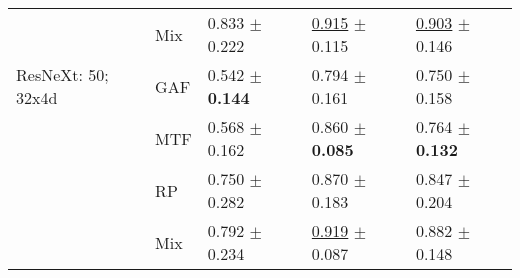 \begin{tabular}{lllll}
 & Mix & \textcolor[rgb]{0.1052631579,0.5000000000,0}{0.833} $\pm$ \textcolor[rgb]{0.5633152435,0.4366847565,0}{0.222} & \underline{\textcolor[rgb]{0.0766423358,0.5000000000,0}{0.915}} $\pm$ \textcolor[rgb]{0.2244136072,0.5000000000,0}{0.115} & \underline{\textcolor[rgb]{0.0967741935,0.5000000000,0}{0.903}} $\pm$ \textcolor[rgb]{0.1092946659,0.5000000000,0}{0.146} \\
ResNeXt: 50; 32x4d & GAF & \textcolor[rgb]{0.8421052632,0.1578947368,0}{0.542} $\pm$ \textbf{\textcolor[rgb]{0.0000000000,0.5000000000,0}{0.144}} & \textcolor[rgb]{0.4108825481,0.5000000000,0}{0.794} $\pm$ \textcolor[rgb]{0.5710931977,0.4289068023,0}{0.161} & \textcolor[rgb]{0.8064516129,0.1935483871,0}{0.750} $\pm$ \textcolor[rgb]{0.2081447489,0.5000000000,0}{0.158} \\
 & MTF & \textcolor[rgb]{0.7751196172,0.2248803828,0}{0.568} $\pm$ \textcolor[rgb]{0.1258520059,0.5000000000,0}{0.162} & \textcolor[rgb]{0.2277372263,0.5000000000,0}{0.860} $\pm$ \textbf{\textcolor[rgb]{0.0000000000,0.5000000000,0}{0.085}} & \textcolor[rgb]{0.7419354839,0.2580645161,0}{0.764} $\pm$ \textbf{\textcolor[rgb]{0.0000000000,0.5000000000,0}{0.132}} \\
 & RP & \textcolor[rgb]{0.3157894737,0.5000000000,0}{0.750} $\pm$ \textcolor[rgb]{1.0000000000,0.0000000000,0}{0.282} & \textcolor[rgb]{0.2014598540,0.5000000000,0}{0.870} $\pm$ \textcolor[rgb]{0.7422118602,0.2577881398,0}{0.183} & \textcolor[rgb]{0.3548387097,0.5000000000,0}{0.847} $\pm$ \textcolor[rgb]{0.5730017598,0.4269982402,0}{0.204} \\
 & Mix & \textcolor[rgb]{0.2105263158,0.5000000000,0}{0.792} $\pm$ \textcolor[rgb]{0.6537497604,0.3462502396,0}{0.234} & \underline{\textcolor[rgb]{0.0656934307,0.5000000000,0}{0.919}} $\pm$ \textcolor[rgb]{0.0110237087,0.5000000000,0}{0.087} & \textcolor[rgb]{0.1935483871,0.5000000000,0}{0.882} $\pm$ \textcolor[rgb]{0.1308023356,0.5000000000,0}{0.148} \\
\bottomrule
\end{tabular}

